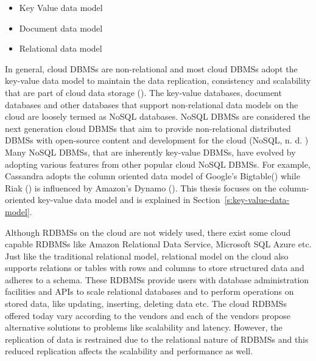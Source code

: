 \begin{itemize}
\item Key Value data model 

\item Document data model 

\item Relational data model
\end{itemize}

In general,   cloud \acp{DBMS} are non-relational and most cloud \acp{DBMS}
adopt the key-value data model to maintain the data replication,   consistency
and scalability that are part of cloud data storage (). The
key-value databases,   document databases and other databases that support
non-relational data models on the cloud are loosely termed as \ac{NoSQL}
databases.  \ac{NoSQL} \acp{DBMS} are considered the next generation cloud
\acp{DBMS} that aim to provide non-relational distributed \acp{DBMS} with
open-source content and development for the cloud (\ac{NoSQL},   n. d. ) Many
\ac{NoSQL} \acp{DBMS},   that are inherently key-value \acp{DBMS},   have
evolved by adopting various features from other popular cloud \ac{NoSQL}
\acp{DBMS}.  For example,   Cassandra adopts the column oriented data model of
Google's Bigtable() while Riak () is influenced by
Amazon's Dynamo ().  This thesis focuses on the column-oriented
key-value data model and is explained in Section~\ref{s:key-value-data-model}.

Although \acp{RDBMS} on the cloud are not widely used,   there exist some cloud
capable \acp{RDBMS} like Amazon Relational Data Service,   Microsoft SQL Azure
etc.  Just like the traditional relational model,   relational model on the
cloud also supports relations or tables with rows and columns to store
structured data and adheres to a schema.  These \acp{RDBMS} provide users with
database administration facilities and APIs to scale relational databases and to
perform operations on stored data,   like updating,   inserting,   deleting data
etc.  The cloud \acp{RDBMS} offered today vary according to the vendors and each
of the vendors propose alternative solutions to problems like scalability and
latency.  However,   the replication of data is restrained due to the relational
nature of \acp{RDBMS} and this reduced replication affects the scalability and
performance as well.  

\newpage


